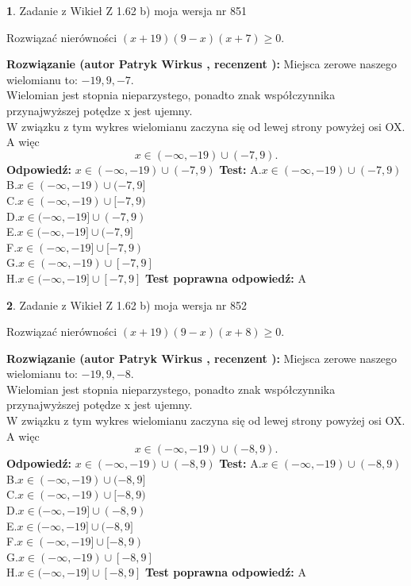 \documentclass[12pt, a4paper]{article}
\theoremstyle{definition} %
\newtheorem{zad}{}
\newcommand{\zadStart}[1]{\begin{zad}#1\newline}
\newcommand{\zadStop}{\end{zad}}
\newcommand{\rozwStart}[2]{\noindent \textbf{Rozwiązanie (autor #1 , recenzent #2): }\newline}
\newcommand{\rozwStop}{\newline}
\newcommand{\odpStart}{\noindent \textbf{Odpowiedź:}\newline}
\newcommand{\odpStop}{\newline}
\newcommand{\testStart}{\noindent \textbf{Test:}\newline}
\newcommand{\testStop}{\newline}
\newcommand{\kluczStart}{\noindent \textbf{Test poprawna odpowiedź:}\newline}
\newcommand{\kluczStop}{\newline}
\begin{document}
\zadStart{Zadanie z Wikieł Z 1.62 b) moja wersja nr 851}

Rozwiązać nierówności $(x+19)(9-x)(x+7)\ge0$.
\zadStop
\rozwStart{Patryk Wirkus}{}
Miejsca zerowe naszego wielomianu to: $-19, 9, -7$.\\
Wielomian jest stopnia nieparzystego, ponadto znak współczynnika przy\linebreak najwyższej potędze x jest ujemny.\\ W związku z tym wykres wielomianu zaczyna się od lewej strony powyżej osi OX. A więc $$x \in (-\infty,-19) \cup (-7,9).$$
\rozwStop
\odpStart
$x \in (-\infty,-19) \cup (-7,9)$
\odpStop
\testStart
A.$x \in (-\infty,-19) \cup (-7,9)$\\
B.$x \in (-\infty,-19) \cup (-7,9]$\\
C.$x \in (-\infty,-19) \cup [-7,9)$\\
D.$x \in (-\infty,-19] \cup (-7,9)$\\
E.$x \in (-\infty,-19] \cup (-7,9]$\\
F.$x \in (-\infty,-19] \cup [-7,9)$\\
G.$x \in (-\infty,-19) \cup [-7,9]$\\
H.$x \in (-\infty,-19] \cup [-7,9]$
\testStop
\kluczStart
A
\kluczStop



\zadStart{Zadanie z Wikieł Z 1.62 b) moja wersja nr 852}

Rozwiązać nierówności $(x+19)(9-x)(x+8)\ge0$.
\zadStop
\rozwStart{Patryk Wirkus}{}
Miejsca zerowe naszego wielomianu to: $-19, 9, -8$.\\
Wielomian jest stopnia nieparzystego, ponadto znak współczynnika przy\linebreak najwyższej potędze x jest ujemny.\\ W związku z tym wykres wielomianu zaczyna się od lewej strony powyżej osi OX. A więc $$x \in (-\infty,-19) \cup (-8,9).$$
\rozwStop
\odpStart
$x \in (-\infty,-19) \cup (-8,9)$
\odpStop
\testStart
A.$x \in (-\infty,-19) \cup (-8,9)$\\
B.$x \in (-\infty,-19) \cup (-8,9]$\\
C.$x \in (-\infty,-19) \cup [-8,9)$\\
D.$x \in (-\infty,-19] \cup (-8,9)$\\
E.$x \in (-\infty,-19] \cup (-8,9]$\\
F.$x \in (-\infty,-19] \cup [-8,9)$\\
G.$x \in (-\infty,-19) \cup [-8,9]$\\
H.$x \in (-\infty,-19] \cup [-8,9]$
\testStop
\kluczStart
A
\kluczStop
\end{document}
